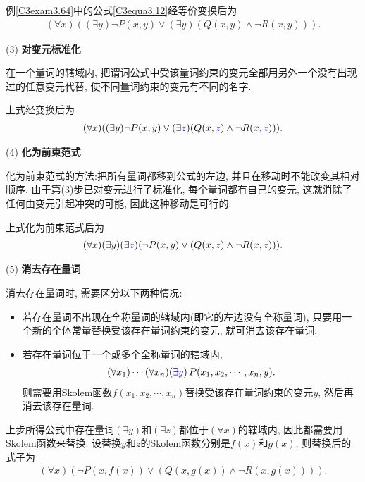 \begin{example}
    例\ref{C3exam3.64}中的公式\eqref{C3equa3.12}经等价变换后为
\begin{align}
  (\forall x)((\exists  y)\neg P(x, y)\vee (\exists  y)(Q(x, y) \wedge \neg R(x, y))).
\end{align}
\end{example}

(3) \textbf{对变元标准化}

在一个量词的辖域内, 把谓词公式中受该量词约束的变元全部用另外一个没有出现过的任意变元代替, 使不同量词约束的变元有不同的名字.
\begin{example}
上式经变换后为
\begin{align}
  (\forall x)((\exists  y)\neg P(x, y)\vee (\exists  \textcolor[rgb]{0,0,1}{z})( Q(x, \textcolor[rgb]{0,0,1}{z}) \wedge \neg R(x, \textcolor[rgb]{0,0,1}{z}))).
\end{align}
\end{example}

(4) \textbf{化为前束范式}

化为前束范式的方法:把所有量词都移到公式的左边, 并且在移动时不能改变其相对顺序. 由于第(3)步已对变元进行了标准化, 每个量词都有自己的变元, 这就消除了任何由变元引起冲突的可能, 因此这种移动是可行的.

\begin{example}
上式化为前束范式后为
\begin{align}
  (\forall x)(\exists  y) (\exists  \textcolor[rgb]{0,0,1}{z})(\neg P(x, y)\vee ( Q(x, z) \wedge \neg R(x, z))).
\end{align}
\end{example}

(5) \textbf{消去存在量词}

消去存在量词时, 需要区分以下两种情况:
\begin{itemize}
\item 若存在量词不出现在全称量词的辖域内(即它的左边没有全称量词), 只要用一个新的个体常量替换受该存在量词约束的变元, 就可消去该存在量词.

\item 若存在量词位于一个或多个全称量词的辖域内,
\begin{align}
    (\forall x_1)\cdots(\forall x_n) (\textcolor[rgb]{0.00,0.00,1.00}{\exists  y})\,P(x_1, x_2 ,\cdots, x_n ,y).
\end{align}
则需要用Skolem函数$f(x_1,x_2,\cdots, x_n)$替换受该存在量词约束的变元$y$, 然后再消去该存在量词.
\end{itemize}
\begin{example}
    上步所得公式中存在量词$(\exists  y)$和$(\exists  z)$都位于$(\forall x)$的辖域内, 因此都需要用Skolem函数来替换. 设替换$y$和$z$的Skolem函数分别是$f(x)$和$g(x)$, 则替换后的式子为
\begin{align}
  (\forall x)(\neg P(x,f(x))\vee (Q(x,g(x))\wedge \neg R(x,g(x)))).
\end{align}
\end{example}

